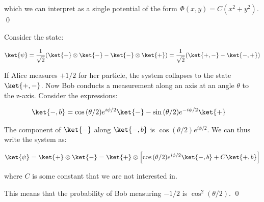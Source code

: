 \documentclass[12pt]{article}
\begin{document}
which we can interpret as a single potential of the form $\Phi(x, y) = C(x^{2} + y^{2})$.
\qed


Consider the state:

\begin{equation}
    \ket{\psi} = \frac{1}{\sqrt{2}} (\ket{+} \otimes \ket{-} - \ket{-} \otimes \ket{+}) = \frac{1}{\sqrt{2}} (\ket{+,-} - \ket{-,+})
\end{equation}

If Alice measures $+1/2$ for her particle, the system collapses to the state $\ket{+,-}$. Now Bob conducts a measurement along an axis at an angle $\theta$ to the z-axis. Consider the expressions:

\begin{equation}
\begin{split}
    \ket{-, b} &= \cos{(\theta/2)} e^{i\phi/2} \ket{-} - \sin{(\theta/2)} e^{-i\phi/2} \ket{+}
\end{split}
\end{equation}

The component of $\ket{-}$ along $\ket{-, b}$ is $\cos{(\theta/2)} e^{i\phi/2}$. We can thus write the system as:

\begin{equation}
    \ket{\psi} = \ket{+} \otimes \ket{-} = \ket{+} \otimes \left[ \cos{(\theta/2)} e^{i\phi/2} \ket{-, b} + C \ket{+, b} \right]
\end{equation}

where $C$ is some constant that we are not interested in. 

This means that the probability of Bob measuring $-1/2$ is $\cos^{2}{(\theta/2)}$.
\qed
\end{document}
